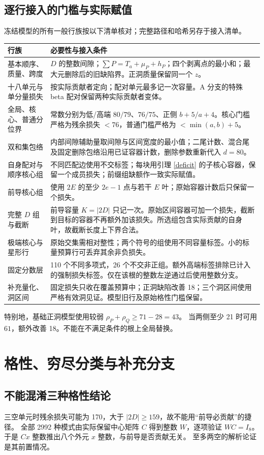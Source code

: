 \documentclass[11pt,a4paper]{article}
\theoremstyle{definition}
\begin{document}
\subsection{逐行接入的门槛与实际赋值}
冻结模型的所有一般行族按以下清单核对；完整路径和哈希另存于接入清单。
\begin{longtable}{p{.26\linewidth}p{.66\linewidth}}
\toprule 行族&必要性与接入条件\\\midrule\endhead
基本顺序、质量、跨度&$D$ 的整数间隙；$\sum P=T_a+\mu_P+h_P$；四个剥离点的最小和；最大元删除后的旧缺陷界。正洞质量保留同一个 $z$。\\
十八单元与单分量损失&按实际贡献者定向；配对单元最多记一次容量。A 分支的特殊 beta 配对保留两种实际贡献者变体。\\
全局、核心、普通分位界&常数分别为低/高端 $80/79$、$76/75$、正侧 $b+5/a+4$。核心门槛严格为残余损失 $<76$，普通门槛严格为 $<\min(a,b)+5$。\\
双和集包络&内部间隙辅助量取间隙与区间宽度的最小值；二尾计数、混合尾及固定删除包络沿用已证容器计数，删除参数重新代入 $d=80$。\\
自身配对与顺序核心组&不同匹配边使用不交标签；每块用引理 \ref{deficit} 的子核心容器，保留一个成员损失；前缀组缺额作一致实际赋值。\\
前导核心组&使用 $2E$ 的至少 $2e-1$ 点与若干 $E$ 叶；原始容器计数后只保留一个损失。\\
完整 $D$ 组与截断&前导容量 $K=|2D|$ 只记一次。原始区间容器可加一个损失，截断到目标的容器不再额外加该损失。所选组包含实际贡献的自身叶，故截断长度上下界合法。\\
极端核心与星形行&原始交集需相对整性；两个符号的组使用不同容量标签。小的标量预算行可丢弃其余非负损失。\\
固定分数层&110 个不同多项式，26 个不交非正组。额外高端标签排除已计入的强制损失标签。仅在该根的整数左逆通过后使用整数分支。\\
补充量化、洞区间&固定损失只收在覆盖预算中；正洞缺陷改善 18；三个洞区间使用严格有效洞见证。模型旧行及原始格性门槛保留。\\\bottomrule
\end{longtable}
特别地，基础正洞模型使用较弱 $\rho_P+\rho_Q\ge71-28=43$。
当两侧至少 21 时可用 $61$，额外改善 18。不能在不满足条件的根上全局替换。

\section{格性、穷尽分类与补充分支}\label{cover}
\subsection{不能混淆三种格性结论}
三空单元时残余损失可能为 170，大于 $|2D|\ge159$，故不能用“前导必贡献”的捷径。
全部 2992 种模式由实际保留中心矩阵 $C$ 得到整数 $W$，逐项验证 $WC=I_8$。
于是 $Cx$ 整数推出八个外元 $x$ 整数，与前导是否贡献无关。
至多两空的解析论证是其前置情况。
\end{document}

